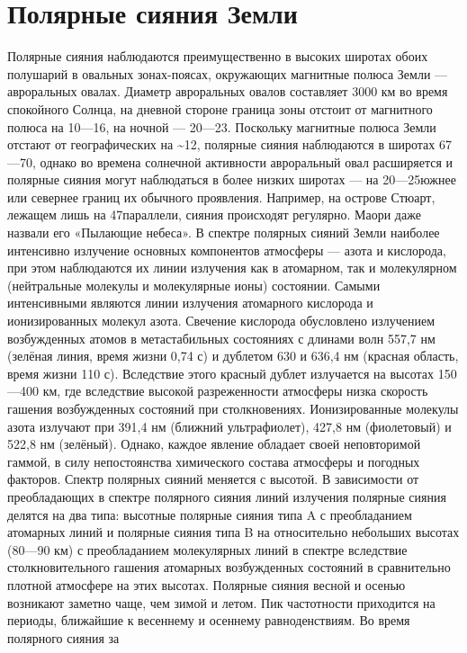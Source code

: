 \documentclass[a4paper,14pt]{article}
\begin{document}
\section{Полярные сияния Земли}
Полярные сияния наблюдаются преимущественно в высоких широтах обоих полушарий в овальных зонах-поясах, 
окружающих магнитные полюса Земли — авроральных овалах. Диаметр авроральных овалов составляет 3000 км во время 
спокойного Солнца, на дневной стороне граница зоны отстоит от магнитного полюса на 10—16\textdegree, на ночной — 20—23\textdegree. 
Поскольку магнитные полюса Земли отстают от географических на \textasciitilde12\textdegree,
полярные сияния наблюдаются в широтах 67—70\textdegree, однако во времена солнечной активности авроральный овал расширяется и полярные сияния могут наблюдаться в более низких широтах — на 20—25\textdegree южнее или
севернее границ их обычного проявления. Например, на острове Стюарт, лежащем лишь на 47\textdegree параллели, сияния происходят регулярно. Маори даже назвали его «Пылающие небеса».
В спектре полярных сияний Земли наиболее интенсивно излучение
основных компонентов атмосферы — азота и кислорода, при этом наблюдаются их линии излучения как в атомарном, так и молекулярном (нейтральные молекулы и молекулярные ионы) состоянии. Самыми интенсивными являются линии излучения атомарного кислорода и ионизированных молекул азота.
Свечение кислорода обусловлено излучением возбужденных атомов в метастабильных состояниях с длинами волн 557,7 нм (зелёная линия,
время жизни 0,74 с) и дублетом 630 и 636,4 нм (красная область, время
жизни 110 с). Вследствие этого красный дублет излучается на высотах
150—400 км, где вследствие высокой разреженности атмосферы низка
скорость гашения возбужденных состояний при столкновениях. Ионизированные молекулы азота излучают при 391,4 нм (ближний ультрафиолет), 427,8 нм (фиолетовый) и 522,8 нм (зелёный). Однако, каждое
явление обладает своей неповторимой гаммой, в силу непостоянства химического состава атмосферы и погодных факторов.
Спектр полярных сияний меняется с высотой. В зависимости от преобладающих в спектре полярного сияния линий излучения полярные сияния делятся на два типа: высотные полярные сияния типа A с преобладанием атомарных линий и полярные сияния типа B на относительно
небольших высотах (80—90 км) с преобладанием молекулярных линий в
спектре вследствие столкновительного гашения атомарных возбужденных состояний в сравнительно плотной атмосфере на этих высотах.
Полярные сияния весной и осенью возникают заметно чаще, чем зимой и летом. Пик частотности приходится на периоды, ближайшие к
весеннему и осеннему равноденствиям. Во время полярного сияния за
\end{document}
